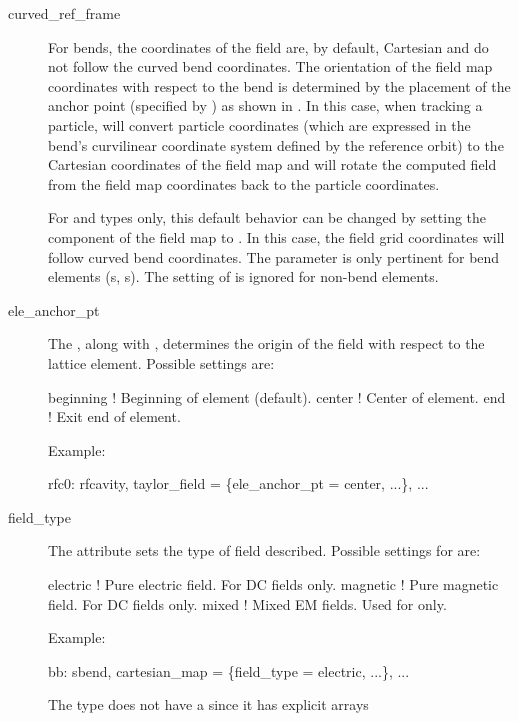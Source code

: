  \begin{description}
  \item[curved_ref_frame] \Newline
For bends, the coordinates of the field are, by default, Cartesian and do not follow the
curved bend coordinates. The orientation of the field map coordinates with respect to the
bend is determined by the placement of the anchor point (specified by )
as shown in . In this case, when tracking a particle, \bmad will convert
particle coordinates (which are expressed in the bend's curvilinear coordinate system
defined by the reference orbit) to the Cartesian coordinates of the field map and will
rotate the computed field from the field map coordinates back to the particle coordinates.

For  and  types only, this default behavior can be changed by
setting the  component of the field map to . In this case,
the field grid coordinates will follow curved bend coordinates.  The 
parameter is only pertinent for bend elements (s, s).  The setting of
 is ignored for non-bend elements.
  \item[ele_anchor_pt] \Newline
The , along with , determines the origin of the field with
respect to the lattice element. Possible settings are:
\begin{example}
  beginning   ! Beginning of element (default).
  center      ! Center of element.
  end         ! Exit end of element.
\end{example}
Example:
\begin{example}
  rfc0: rfcavity, taylor_field = \{ele_anchor_pt = center, ...\}, ...
\end{example}
  \item[field_type] \Newline
The  attribute sets the type of field described. Possible settings for
 are:
\begin{example}
  electric      ! Pure electric field. For DC fields only.
  magnetic      ! Pure magnetic field. For DC fields only.
  mixed         ! Mixed EM fields. Used for  only.
\end{example}
Example:
\begin{example}
  bb: sbend, cartesian_map = \{field_type = electric, ...\}, ...
\end{example}
The  type does not have a  since it has explicit arrays

\end{description}
